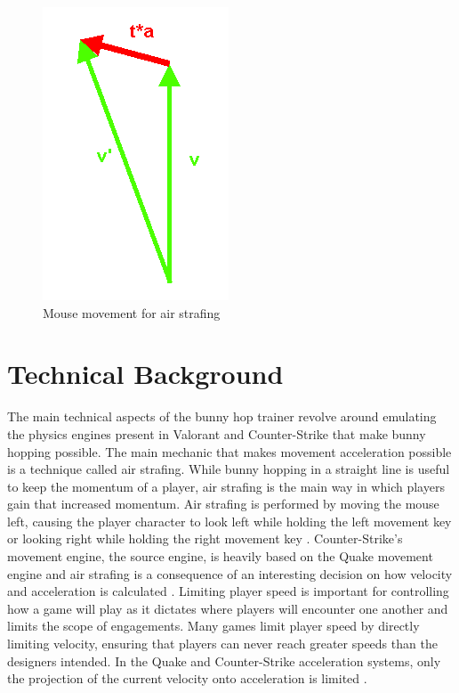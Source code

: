 \documentclass[10pt,twocolumn]{article}
\begin{document}
\begin{figure}
    \centering
    \includegraphics[width=0.5\linewidth]{figure2.png}
    \caption{Mouse movement for air strafing \cite{MoreSteamAirstrafe}}
\end{figure}

\section{Technical Background}


The main technical aspects of the bunny hop trainer revolve around emulating the physics engines present in Valorant and Counter-Strike that make bunny hopping possible. The main mechanic that makes movement acceleration possible is a technique called air strafing. While bunny hopping in a straight line is useful to keep the momentum of a player, air strafing is the main way in which players gain that increased momentum. Air strafing is performed by moving the mouse left, causing the player character to look left while holding the left movement key or looking right while holding the right movement key \cite{AirStrafingExplained}. Counter-Strike's movement engine, the source engine, is heavily based on the Quake movement engine and air strafing is a consequence of an interesting decision on how velocity and acceleration is calculated \cite{AirStrafingExplained}. Limiting player speed is important for controlling how a game will play as it dictates where players will encounter one another and limits the scope of engagements. Many games limit player speed by directly limiting velocity, ensuring that players can never reach greater speeds than the designers intended. In the Quake and Counter-Strike acceleration systems, only the projection of the current velocity onto acceleration is limited \cite{BunnyHoppingProgrammers}.
\end{document}
